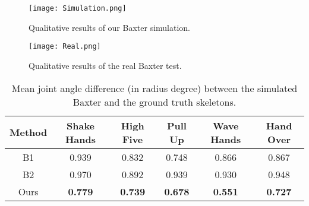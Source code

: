 \documentclass[letterpaper, 10 pt, conference]{ieeeconf}  %
\begin{document}
\begin{figure*}[t!]
    \centering
    \texttt{[image: Simulation.png]}
    \vspace{-5pt}
    \caption{Qualitative results of our Baxter simulation.}
    \vspace{-10pt}
    \label{fig:simulation}
\end{figure*}

\begin{figure*}[t!]
    \centering
    \texttt{[image: Real.png]}
    \vspace{-15pt}
    \caption{Qualitative results of the real Baxter test.}
    \vspace{-10pt}
    \label{fig:real}
\end{figure*}

\begin{table}[t!]\scriptsize
\caption{Mean joint angle difference (in radius degree) between the simulated Baxter and the ground truth skeletons.}
\label{table:quantitative}
\vspace{-5pt}
\centering
\tabcolsep=0.10cm
\begin{tabular}{c|c|c|c|c|c} \hline
Method   & Shake Hands & High Five & Pull Up & Wave Hands & Hand Over \\ \hline
B1 &   0.939 & 0.832 & 0.748 & 0.866 & 0.867    \\ \hline
B2  &   0.970 & 0.892 & 0.939 & 0.930 & 0.948   \\ \hline
Ours & \textbf{0.779} & \textbf{0.739} & \textbf{0.678} & \textbf{0.551} & \textbf{0.727} \\ \hline
\end{tabular}
\end{table}
\end{document}
